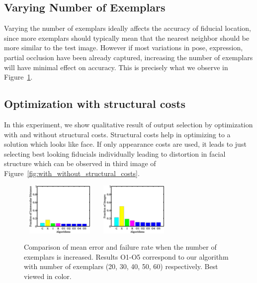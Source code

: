 \subsection{Varying Number of Exemplars}
\label{subsec:varying_number_of_exemplars}
Varying the number of exemplars ideally affects the accuracy of fiducial location, since
more exemplars should typically mean that the nearest neighbor
 should be more similar to the test image. However if most
variations in pose, expression, partial occlusion have been already captured, increasing the number
of exemplars will have minimal effect on accuracy. This is precisely what we observe in
Figure~\ref{fig:num_exemplars}.
\subsection{Optimization with structural costs}
\label{subsec:with_without_structural_costs}
In this experiment, we show qualitative result of output selection by optimization with and without
structural costs. Structural costs help in optimizing to a solution which looks like face. If only
appearance costs are used, it leads to just selecting best looking fiducials individually leading to distortion in facial structure which can be observed in third image of Figure~\ref{fig:with_without_structural_costs}.

\begin{figure}
  \centering
  \includegraphics[width=1.5in,height=1.0in]{fid/figures/iccv_version_one/cofw/num_of_exemplars/mean_err_modified.jpg}
  \includegraphics[width=1.5in,height=1.0in]{fid/figures/iccv_version_one/cofw/num_of_exemplars/fail_rate_modified.jpg}
  \caption{ Comparison of mean error and failure rate when the number of exemplars is increased.
  Results O1-O5 correspond to our algorithm with number of exemplars (20, 30, 40, 50, 60)
  respectively.
  Best viewed in color. }
  \label{fig:num_exemplars}
\end{figure}

